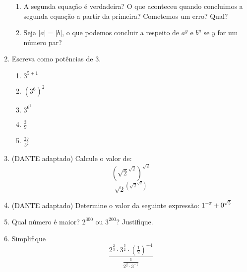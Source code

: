 \documentclass{article}
\begin{document}
\begin{enumerate}
\begin{enumerate}[label=\alph*)]
           \item A segunda equação é verdadeira? O que aconteceu quando concluimos a segunda equação a partir da primeira? Cometemos um erro? Qual?
           \item Seja $ |a| = |b|$, o que podemos concluir a respeito de
               $ a^y$ e $b^y $ se $y$ for um número par?
        \end{enumerate}
    \item Escreva como potências de 3.
        \begin{enumerate}[label=\alph*)]
            \item $3^{5+1}$
            \item ${(3^6)}^2$
            \item $3^{6^2}$
            \item $\frac{3}{9}$
            \item $\frac{27}{3^2}$
        \end{enumerate}
    \item (DANTE adaptado) Calcule o valor de: 
        \begin{equation*} 
            { \left( {\sqrt{2}}^{\sqrt{2} } \right) }^{\sqrt{2}}
        \end{equation*}
        \begin{equation*} 
            { {\sqrt{2}}^ {\left( {\sqrt{2} }^{\sqrt{2}} \right) }}
        \end{equation*}
    \item (DANTE adaptado) Determine o valor da seguinte expressão: $ 1^{-\pi} + 0^{\sqrt{5}}$
    \item Qual número é maior? $2^{300}$ ou $3^{200}$? Justifique.
    \item Simplifique
        $$ \dfrac{ {2^{\frac{2}{3}}} \cdot {3^{\frac{3}{2}}} \cdot {\left( {\frac{1}{2} } \right)}^{-4}}{\frac{1}{2^{\frac{3}{2}} \cdot 3^{-1}}} $$
\end{enumerate}
\end{document}
